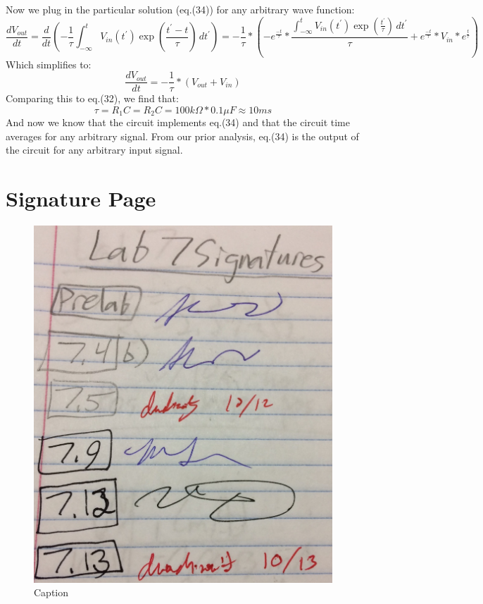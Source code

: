 \documentclass{article}
\begin{document}
    Now we plug in the particular solution (eq.(34)) for any arbitrary wave function:
    \begin{equation}
        \frac{dV_{out}}{dt} = \frac{d}{dt} (-\frac{1}{\tau}\int_{-\infty}^{t}V_{in}(t^\prime)\exp\left(\frac{t^\prime-t}{\tau}\right)\,dt^\prime) = -\frac{1}{\tau}*(-\mathit{e}^{\frac{-t}{\tau}}*\frac{\int_{-\infty}^{t}V_{in}(t^\prime)\exp\left(\frac{t^\prime}{\tau}\right)\,dt^\prime}{\tau} + \mathit{e}^{\frac{-t}{\tau}}*V_{in}*\mathit{e}^{\frac{t}{\tau}})
    \end{equation}
    Which simplifies to:
    \begin{equation}
        \frac{dV_{out}}{dt} = -\frac{1}{\tau}*(V_{out} + V_{in})
    \end{equation}
    Comparing this to eq.(32), we find that:
    \begin{equation}
        \tau = R_1 C = R_2 C = 100k\Omega * 0.1 \mu F \approx 10 ms
    \end{equation}
    And now we know that the circuit implements eq.(34) and that the circuit time averages for any arbitrary signal. From our prior analysis, eq.(34) is the output of the circuit for any arbitrary input signal.
    
    
\section{Signature Page}
\begin{figure}[H]
    \centering
    \includegraphics[scale = 0.3]{sig.JPG}
    \caption{Caption}
    \label{fig:my_label}
\end{figure}

{}

\end{document}
